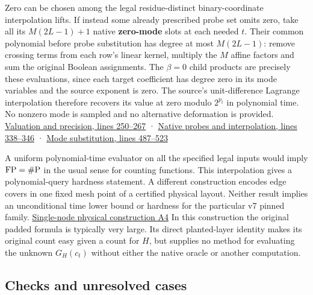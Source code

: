 \documentclass[
  11pt,
]{article}
\begin{document}
Zero can be chosen among the legal residue-distinct binary-coordinate
interpolation lifts. If instead some already prescribed probe set omits
zero, take all its \(M(2L-1)+1\) native \textbf{zero-mode} slots at each
needed \(t\). Their common polynomial before probe substitution has
degree at most \(M(2L-1)\): remove crossing terms from each row's linear
kernel, multiply the \(M\) affine factors and sum the original Boolean
assignments. The \(\beta=0\) child products are precisely these
evaluations, since each target coefficient has degree zero in its mode
variables and the source exponent is zero. The source's unit-difference
Lagrange interpolation therefore recovers its value at zero modulo
\(2^{p_t}\) in polynomial time. No nonzero mode is sampled and no
alternative deformation is provided.
\href{https://github.com/openai/math/blob/main/preprints/The-Exponential-Time-Hypothesis-is-False-October-25-2026/build/quantitative-contraction.tex\#L250}{Valuation
and precision, lines 250--267} ·
\href{https://github.com/openai/math/blob/main/preprints/The-Exponential-Time-Hypothesis-is-False-October-25-2026/build/quantitative-contraction.tex\#L338}{Native
probes and interpolation, lines 338--346} ·
\href{https://github.com/openai/math/blob/main/preprints/The-Exponential-Time-Hypothesis-is-False-October-25-2026/build/quantitative-contraction.tex\#L487}{Mode
substitution, lines 487--523}

A uniform polynomial-time evaluator on all the specified legal inputs
would imply \({\rm FP}=\#{\rm P}\) in the usual sense for counting
functions. This interpolation gives a polynomial-query hardness
statement. A different construction encodes edge covers in one fixed
mesh point of a certified physical layout. Neither result implies an
unconditional time lower bound or hardness for the particular v7 pinned
family. \hyperref[v9-section-acquisition-cost]{Single-node physical
construction A4} In this construction the original padded formula is
typically very large. Its direct planted-layer identity makes its
original count easy given a count for \(H\), but supplies no method for
evaluating the unknown \(G_H(c_t)\) without either the native oracle or
another computation.

\subsection{Checks and unresolved
cases}\label{v9-checks-and-unresolved-cases}
\end{document}
